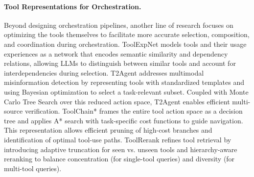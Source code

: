 \paragraph{Tool Representations for Orchestration.} Beyond designing orchestration pipelines, another line of research focuses on optimizing the tools themselves to facilitate more accurate selection, composition, and coordination during orchestration. ToolExpNet \citep{DBLP:conf/acl/ZhangCZCDL25} models tools and their usage experiences as a network that encodes semantic similarity and dependency relations, allowing LLMs to distinguish between similar tools and account for interdependencies during selection. 
T2Agent \citep{DBLP:journals/corr/abs-2505-19768} addresses multimodal misinformation detection by representing tools with standardized templates and using Bayesian optimization to select a task-relevant subset. Coupled with Monte Carlo Tree Search over this reduced action space, T2Agent enables efficient multi-source verification.
ToolChain* \citep{DBLP:conf/iclr/ZhuangC0MBRS024} frames the entire tool action space as a decision tree and applies A* search with task-specific cost functions to guide navigation. This representation allows efficient pruning of high-cost branches and identification of optimal tool-use paths.
ToolRerank \citep{DBLP:conf/coling/ZhengLLLLW24} refines tool retrieval by introducing adaptive truncation for seen vs. unseen tools and hierarchy-aware reranking to balance concentration (for single-tool queries) and diversity (for multi-tool queries).
